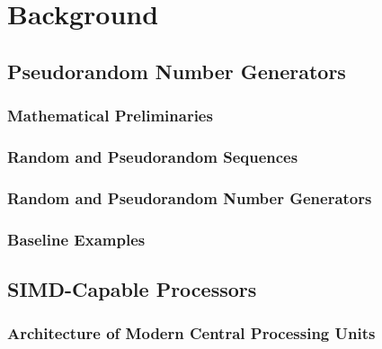 \documentclass[crop=false]{standalone}
\begin{document}
  \section{Background} %
  \label{sec:background}
    \subsection{Pseudorandom Number Generators} %
    \label{sub:pseudorandom_number_generators}
      \subsubsection*{Mathematical Preliminaries} %
      \label{ssub:mathematical_preliminaries}


      \subsubsection*{Random and Pseudorandom Sequences} %
      \label{ssub:random_and_pseudorandom_sequences}


      \subsubsection*{Random and Pseudorandom Number Generators} %
      \label{ssub:random_and_pseudorandom_number_generators}


      \subsubsection*{Baseline Examples} %
      \label{ssub:baseline_examples}


    \subsection{SIMD-Capable Processors} %
    \label{sub:simd-capable_processors}
      \subsubsection*{Architecture of Modern Central Processing Units} %
      \label{ssub:architecture_of_modern_central_processing_units}
\end{document}
